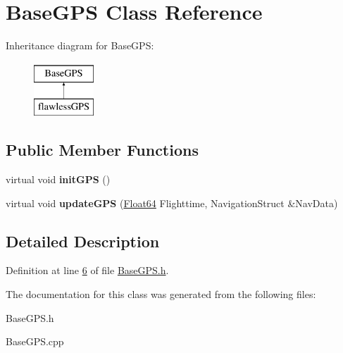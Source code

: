 \hypertarget{class_base_g_p_s}{}\section{Base\+G\+PS Class Reference}
\label{class_base_g_p_s}
Inheritance diagram for Base\+G\+PS\+:\begin{figure}[H]
\begin{center}
\leavevmode
\includegraphics[height=2.000000cm]{class_base_g_p_s}
\end{center}
\end{figure}
\subsection*{Public Member Functions}
\begin{DoxyCompactItemize}
\item 
\mbox{\label{class_base_g_p_s_a68dbbdd67e5d9de606810377f1cec0e3}} 
virtual void {\bfseries init\+G\+PS} ()
\item 
\mbox{\label{class_base_g_p_s_a5a1340c7a621c5ae78375ebf64799628}} 
virtual void {\bfseries update\+G\+PS} (\hyperlink{group___tools_ga3f1431cb9f76da10f59246d1d743dc2c}{Float64} Flighttime, Navigation\+Struct \&Nav\+Data)
\end{DoxyCompactItemize}


\subsection{Detailed Description}


Definition at line \hyperlink{_base_g_p_s_8h_source_l00006}{6} of file \hyperlink{_base_g_p_s_8h_source}{Base\+G\+P\+S.\+h}.



The documentation for this class was generated from the following files\+:\begin{DoxyCompactItemize}
\item 
Base\+G\+P\+S.\+h\item 
Base\+G\+P\+S.\+cpp\end{DoxyCompactItemize}
